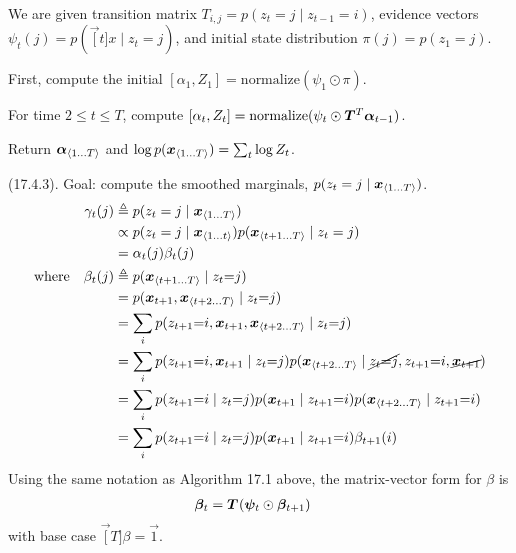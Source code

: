 \documentclass[11pt]{article}
\begin{document}
\begin{algorithm}
	We are given transition matrix $T_{i,j} = p(z_t = j \mid z_{t-1} = i)$, evidence vectors $\psi_t(j) = p(\vec[t]{x} \mid z_t{=}j)$, and initial state distribution $\pi(j) = p(z_1 = j)$. 
	
	\begin{compactenum}
		\item First, compute the initial $[\alpha_1, Z_1] = \text{normalize}(\psi_1 \odot \pi)$. 
		
		\item For time $2 \le t \le T$, compute $[\alpha_t, Z_t] = \text{normalize}(\psi_t \odot \matr{T}^T \vec[t-1]{\alpha})$. 
		
		\item Return $\slice[T]{\alpha}$ and $\log p(\slice[T]{x}) = \sum_t \log Z_t$. 
	\end{compactenum} 
\end{algorithm}

\myspace
\p {} (17.4.3). Goal: compute the smoothed marginals, $p(z_t = j \mid \slice[T]{x})$. 
\begin{align}
	\gamma_t(j)
		&\triangleq p(z_t = j \mid \slice[T]{x})   \\
		&\propto p(z_t = j \mid \slice[t]{x}) p(\slice[T][t+1]{x} \mid z_t = j) \\
		&= \alpha_t(j) \beta_t(j) \\
	\text{where}\quad
	\beta_t(j)
		&\triangleq p(\slice[T][t+1]{x} \mid z_t {=} j)  \\
		&= p(\vec[t+1]{x}, \slice[T][t+2]{x} \mid z_t{=}j ) \\
		&= \sum_{i} p(z_{t+1}{=}i, \vec[t+1]{x}, \slice[T][t+2]{x} \mid z_t{=}j ) \\
		&= \sum_i p(z_{t+1}{=}i, \vec[t+1]{x} \mid z_t{=}j) p(\slice[T][t+2]{x} \mid \cancel{z_t{=}j}, z_{t+1}{=}i, \cancel{\vec[t+1]{x}} ) \\
		&= \sum_i p(z_{t+1}{=}i \mid z_t{=}j) p(\vec[t+1]{x} \mid z_{t+1}{=}i) p(\slice[T][t+2]{x} \mid z_{t+1}{=}i) \\
		&=  \sum_i p(z_{t+1}{=}i \mid z_t{=}j) p(\vec[t+1]{x} \mid z_{t+1}{=}i) \beta_{t+1}(i)
\end{align}
Using the same notation as Algorithm 17.1 above, the matrix-vector form for $\beta$ is
\begin{align}
	\vec[t]{\beta} &= \matr{T} \left( \vec[t]{\psi} \odot \vec[t+1]{\beta}  \right)
\end{align}
with base case $\vec[T]{\beta} = \vec{1}$. 
\end{document}
